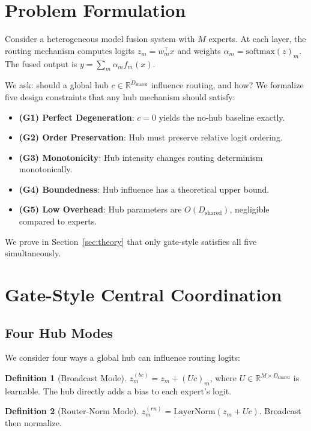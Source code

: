 \documentclass[10pt,twoside]{article}
\theoremstyle{definition}
\newtheorem{definition}{Definition}[section]
\begin{document}
\section{Problem Formulation}

Consider a heterogeneous model fusion system with $M$ experts. At each layer, the routing mechanism computes logits $z_m = w_m^\top x$ and weights $\alpha_m = \text{softmax}(z)_m$. The fused output is $y = \sum_m \alpha_m f_m(x)$.

We ask: should a global hub $c \in \mathbb{R}^{D_{\text{shared}}}$ influence routing, and how? We formalize five design constraints that any hub mechanism should satisfy:

\begin{itemize}
    \item \textbf{(G1) Perfect Degeneration}: $c=0$ yields the no-hub baseline exactly.
    \item \textbf{(G2) Order Preservation}: Hub must preserve relative logit ordering.
    \item \textbf{(G3) Monotonicity}: Hub intensity changes routing determinism monotonically.
    \item \textbf{(G4) Boundedness}: Hub influence has a theoretical upper bound.
    \item \textbf{(G5) Low Overhead}: Hub parameters are $O(D_{\text{shared}})$, negligible compared to experts.
\end{itemize}

We prove in Section~\ref{sec:theory} that only gate-style satisfies all five simultaneously.

\section{Gate-Style Central Coordination}

\subsection{Four Hub Modes}
\label{sec:modes}

We consider four ways a global hub can influence routing logits:

\begin{definition}[Broadcast Mode]
    $z_m^{(bc)} = z_m + (U c)_m$, where $U \in \mathbb{R}^{M \times D_{\text{shared}}}$ is learnable. The hub directly adds a bias to each expert's logit.
\end{definition}

\begin{definition}[Router-Norm Mode]
    $z_m^{(rn)} = \text{LayerNorm}(z_m + U c)$. Broadcast then normalize.
\end{definition}
\end{document}
